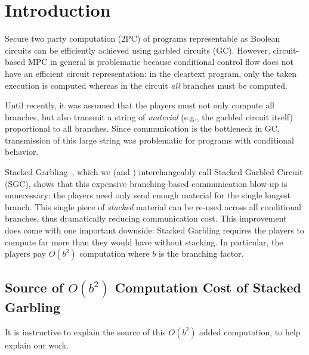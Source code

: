 \section{Introduction}\label{sec:intro}

Secure two party computation (2PC) of programs representable as Boolean circuits can be efficiently achieved using garbled circuits (GC).
%
However,  circuit-based MPC in general is problematic because conditional
control flow does not have an efficient circuit representation:
in the cleartext program, only the taken execution is computed whereas in
the circuit \emph{all} branches must be computed.

%
Until recently, it was assumed that the players must not only compute
all branches, but also transmit a string of \emph{material} (e.g., the garbled circuit itself) 
proportional to all branches.  
Since communication is the bottleneck in GC, transmission of this large string was
problematic for programs with conditional behavior.

Stacked Garbling~\HK, which we (and \HK)  interchangeably call Stacked Garbled Circuit (SGC), shows that
this expensive branching-based communication blow-up is unnecessary: the players need only
send enough material for the single longest branch. This single
piece of \emph{stacked} material can be re-used across all conditional branches, thus
dramatically reducing communication cost.
%
This improvement does come with one important downside:
Stacked Garbling requires the players to compute far more than they
would have without stacking.
In particular, the players pay $O(b^2)$ computation where $b$ is the
branching factor.

\subsection{Source of $O(b^2)$ Computation Cost of Stacked Garbling }

It is instructive to explain the source of this $O(b^2)$ added computation, to help explain our work.

